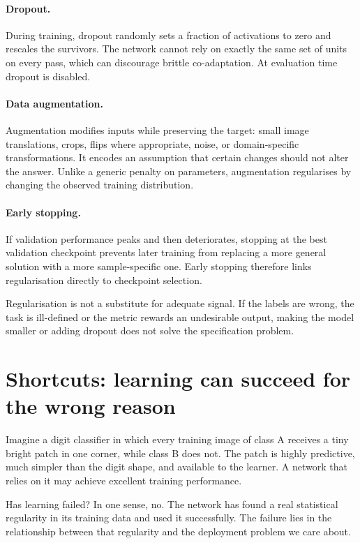 \paragraph{Dropout.}
During training, dropout randomly sets a fraction of activations to zero and rescales the survivors. The network cannot rely on exactly the same set of units on every pass, which can discourage brittle co-adaptation. At evaluation time dropout is disabled.

\paragraph{Data augmentation.}
Augmentation modifies inputs while preserving the target: small image translations, crops, flips where appropriate, noise, or domain-specific transformations. It encodes an assumption that certain changes should not alter the answer. Unlike a generic penalty on parameters, augmentation regularises by changing the observed training distribution.

\paragraph{Early stopping.}
If validation performance peaks and then deteriorates, stopping at the best validation checkpoint prevents later training from replacing a more general solution with a more sample-specific one. Early stopping therefore links regularisation directly to checkpoint selection.

Regularisation is not a substitute for adequate signal. If the labels are wrong, the task is ill-defined or the metric rewards an undesirable output, making the model smaller or adding dropout does not solve the specification problem.

\section{Shortcuts: learning can succeed for the wrong reason}

Imagine a digit classifier in which every training image of class A receives a tiny bright patch in one corner, while class B does not. The patch is highly predictive, much simpler than the digit shape, and available to the learner. A network that relies on it may achieve excellent training performance.

Has learning failed? In one sense, no. The network has found a real statistical regularity in its training data and used it successfully. The failure lies in the relationship between that regularity and the deployment problem we care about.

